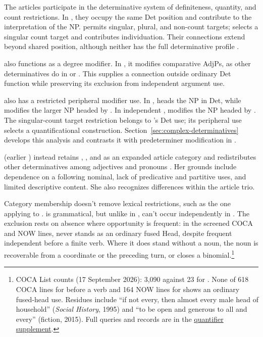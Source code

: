 \documentclass[12pt]{article}
\begin{document}
The articles participate in the determinative system of definiteness, quantity, and count restrictions. In , they occupy the same Det position and contribute to the interpretation of the NP.  permits singular, plural, and non-count targets;  selects a singular count target and contributes individuation. Their connections extend beyond shared position, although neither has the full determinative profile \citep[368--373]{huddleston2002}.

 also functions as a degree modifier. In , it modifies comparative AdjPs, as other determinatives do in  or  \citep[1131--1132, 1135--1136]{huddleston2002}. This supplies a connection outside ordinary Det function while preserving its exclusion from independent argument use.

 also has a restricted peripheral modifier use. In ,  heads the NP in Det, while  modifies the larger NP headed by . In independent ,  modifies the NP headed by . The singular-count target restriction belongs to 's Det use; its peripheral use selects a quantificational construction. Section~\ref{sec:complex-determinatives} develops this analysis and contrasts it with predeterminer modification in .

\textcite[153--158]{spinillo2004reconceptualising} (earlier \citealp{spinillo2000determiners}) instead retains , , and  as an expanded article category and redistributes other determinatives among adjectives and pronouns \citep[194--195]{spinillo2004reconceptualising}. Her grounds include dependence on a following nominal, lack of predicative and partitive uses, and limited descriptive content. She also recognizes differences within the article trio.

Category membership doesn't remove lexical restrictions, such as the one applying to .  is grammatical, but unlike  in ,  can't occur independently in . The exclusion rests on absence where opportunity is frequent: in the screened COCA and NOW lines,  never stands as an ordinary fused Head, despite frequent independent  before a finite verb. Where it does stand without a noun, the noun is recoverable from a coordinate or the preceding turn, or  closes a binomial.\footnote{COCA List counts (17 September 2026):  3,090 against 23 for . None of 618 COCA lines for  before a verb and 164 NOW lines for  shows an ordinary fused-head use. Residues include \enquote{if not every, then almost every male head of household} (\textit{Social History}, 1995) and \enquote{to be open and generous to all and every} (fiction, 2015). Full queries and records are in the \href{run:quantifier-controls.pdf}{quantifier supplement}.}
\end{document}
